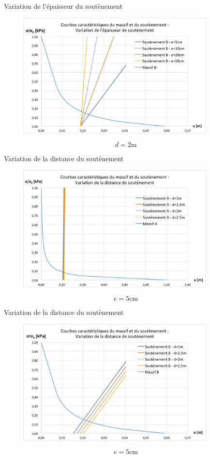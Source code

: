 \documentclass{beamer}
\begin{document}
\begin{frame}{Variation de l'épaisseur du soutènement}

\begin{figure}
\centering
\includegraphics[width=10cm]{var_eB.png}
\end{figure}
\[d=2\text{m}\]
\end{frame}


\begin{frame}{Variation de la distance du soutènement}
    
\begin{figure}
\centering
\includegraphics[width=10cm]{var_dA.png}
\end{figure}
\[e=5\text{cm}\]
\end{frame}



\begin{frame}{Variation de la distance du soutènement}
    
\begin{figure}
\centering
\includegraphics[width=10cm]{var_dB.png}
\end{figure}
\[e=5\text{cm}\]
\end{frame}
\end{document}
